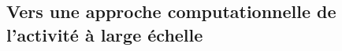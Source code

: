 \documentclass[11pt]{article}
\begin{document}

















\subsection{Vers une approche computationnelle de l'activité à large échelle}
\end{document}
